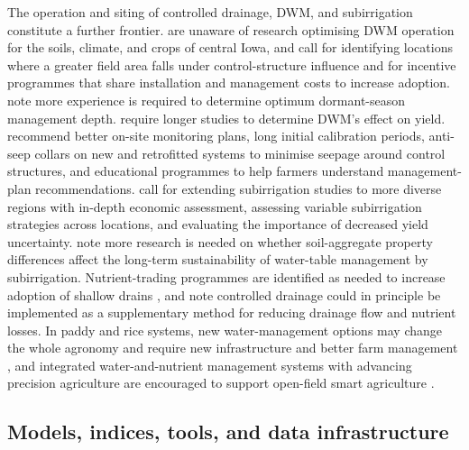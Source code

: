The operation and siting of controlled drainage, DWM, and subirrigation constitute a further frontier. \textcite{Jaynes2012} are unaware of research optimising DWM operation for the soils, climate, and crops of central Iowa, and call for identifying locations where a greater field area falls under control-structure influence and for incentive programmes that share installation and management costs to increase adoption. \textcite{Adeuya2012} note more experience is required to determine optimum dormant-season management depth. \textcite{Cooke2012} require longer studies to determine DWM's effect on yield. \textcite{Gunn2015} recommend better on-site monitoring plans, long initial calibration periods, anti-seep collars on new and retrofitted systems to minimise seepage around control structures, and educational programmes to help farmers understand management-plan recommendations. \textcite{Gunn2019} call for extending subirrigation studies to more diverse regions with in-depth economic assessment, assessing variable subirrigation strategies across locations, and evaluating the importance of decreased yield uncertainty. \textcite{Baker2004} note more research is needed on whether soil-aggregate property differences affect the long-term sustainability of water-table management by subirrigation. Nutrient-trading programmes are identified as needed to increase adoption of shallow drains \parencite{Ghane2021b}, and \textcite{HernandezRamirez2011} note controlled drainage could in principle be implemented as a supplementary method for reducing drainage flow and nutrient losses. In paddy and rice systems, new water-management options may change the whole agronomy and require new infrastructure and better farm management \parencite{DarziNaftchali2014}, and integrated water-and-nutrient management systems with advancing precision agriculture are encouraged to support open-field smart agriculture \parencite{Jung2024}.

\subsection{Models, indices, tools, and data infrastructure}

